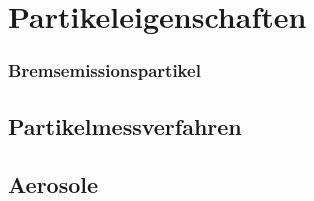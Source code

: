 \section{Partikeleigenschaften}

\subsubsection{Bremsemissionspartikel}

\subsection{Partikelmessverfahren}

\subsection{Aerosole}
